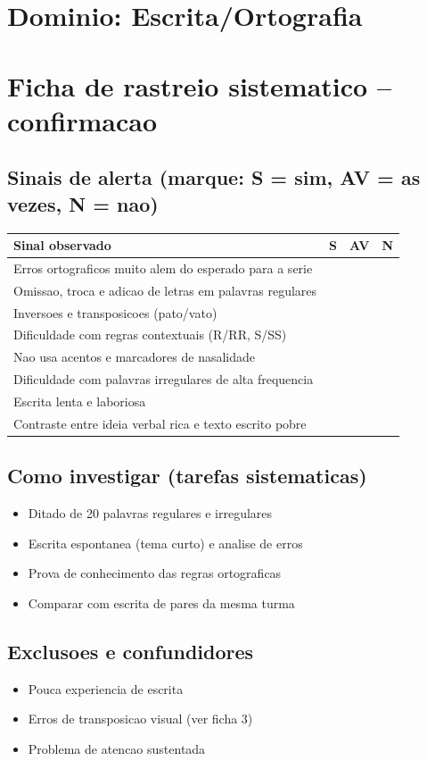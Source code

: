 \documentclass[a4paper,11pt]{book}
\begin{document}
\section*{Dominio: Escrita/Ortografia}
\section*{Ficha de rastreio sistematico -- confirmacao}
\subsection*{Sinais de alerta (marque: S = sim, AV = as vezes, N = nao)}
\begin{tabular}{@{}p{11.5cm}ccc@{}}\toprule
Sinal observado & S & AV & N \\\midrule
Erros ortograficos muito alem do esperado para a serie & & & \\
Omissao, troca e adicao de letras em palavras regulares & & & \\
Inversoes e transposicoes (pato/vato) & & & \\
Dificuldade com regras contextuais (R/RR, S/SS) & & & \\
Nao usa acentos e marcadores de nasalidade & & & \\
Dificuldade com palavras irregulares de alta frequencia & & & \\
Escrita lenta e laboriosa & & & \\
Contraste entre ideia verbal rica e texto escrito pobre & & & \\
\bottomrule\end{tabular}
\subsection*{Como investigar (tarefas sistematicas)}
\begin{itemize}
\item Ditado de 20 palavras regulares e irregulares
\item Escrita espontanea (tema curto) e analise de erros
\item Prova de conhecimento das regras ortograficas
\item Comparar com escrita de pares da mesma turma
\end{itemize}
\subsection*{Exclusoes e confundidores}
\begin{itemize}
\item Pouca experiencia de escrita
\item Erros de transposicao visual (ver ficha 3)
\item Problema de atencao sustentada
\end{itemize}
\end{document}
